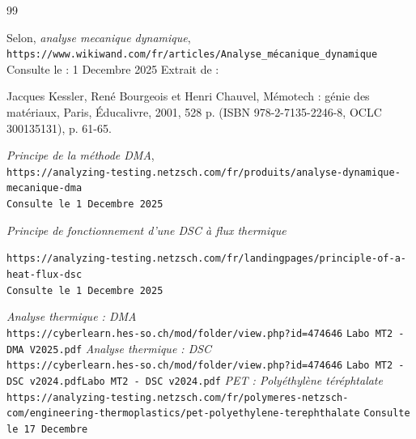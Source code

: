 \documentclass[letterpaper,12pt]{article}
\begin{document}
\begin{thebibliography}{99}


Selon,
                \textit{analyse mecanique dynamique},
\\
                \texttt{https://www.wikiwand.com/fr/articles/Analyse_mécanique_dynamique}
\\
        Consulte le : 1 Decembre 2025
\newline
Extrait de : \newline

Jacques Kessler, René Bourgeois et Henri Chauvel, Mémotech : génie des matériaux, Paris, Éducalivre, 2001, 528 p. (ISBN 978-2-7135-2246-8, OCLC 300135131), p. 61-65.


                        \textit{Principe de la méthode DMA},
\\
                \texttt{https://analyzing-testing.netzsch.com/fr/produits/analyse-dynamique-mecanique-dma}
\\
		\texttt{Consulte le 1 Decembre 2025}

	
	\textit{Principe de fonctionnement d'une DSC à flux thermique}

	\texttt{https://analyzing-testing.netzsch.com/fr/landingpages/principle-of-a-heat-flux-dsc}
\\
		\texttt{Consulte le 1 Decembre 2025}

	\textit{Analyse thermique : DMA}
		\\
		\texttt{https://cyberlearn.hes-so.ch/mod/folder/view.php?id=474646}
		\texttt{Labo MT2 - DMA V2025.pdf}
	\textit{Analyse thermique : DSC}
		\\
		\texttt{https://cyberlearn.hes-so.ch/mod/folder/view.php?id=474646}
		\texttt{Labo MT2 - DSC v2024.pdfLabo MT2 - DSC v2024.pdf}
		\textit{PET : Polyéthylène téréphtalate}
		\\
		\texttt{https://analyzing-testing.netzsch.com/fr/polymeres-netzsch-com/engineering-thermoplastics/pet-polyethylene-terephthalate}
		\texttt{Consulte le 17 Decembre}

\end{thebibliography}





\end{document}
